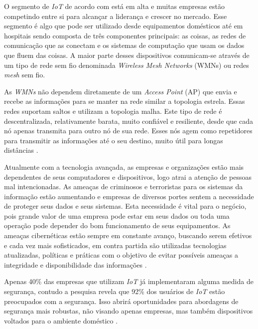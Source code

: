 \par O segmento de \emph{IoT} de acordo com  está em alta e muitas empresas estão competindo entre si para alcançar a liderança e crescer no mercado. Esse segmento é algo que pode ser utilizado desde equipamentos domésticos até em hospitais sendo composta de três componentes principais: as coisas, as redes de comunicação que as conectam e os sistemas de computação que usam os dados que fluem das coisas. A maior parte desses dispositivos comunicam-se através de um tipo de rede sem fio denominada \emph{Wireless Mesh Networks} (WMNs) ou redes \emph{mesh} sem fio.

\par As \emph{WMNs} não dependem diretamente de um \emph{Access Point} (AP) que envia e recebe as informa\c{c}\~oes para se manter na rede similar a topologia estrela. Essas redes suportam saltos e utilizam a topologia malha. Este tipo de rede é descentralizada, relativamente barata, muito confiável e resiliente, desde que cada n\'o apenas transmita para outro n\'o de sua rede. Esses n\'os agem como repetidores para transmitir as informações até o seu destino, muito útil para longas distâncias \cite{siddiqui2007}.

\par Atualmente com a tecnologia avançada, as empresas e organizações estão mais dependentes de seus computadores e dispositivos, logo atrai a aten\c{c}\~ao de pessoas mal intencionadas. As ameaças de criminosos e terroristas para os sistemas da informação estão aumentando e empresas de diversos portes sentem a necessidade de proteger seus dados e seus sistemas. Esta necessidade é vital para o negócio, pois grande valor de uma empresa pode estar em seus dados ou toda uma operação pode depender do bom funcionamento de seus equipamentos. As ameaças cibernéticas estão sempre em constante avanço, buscando serem efetivos e cada vez mais sofisticados, em contra partida s\~ao utilizadas tecnologias atualizadas, pol\'iticas e pr\'aticas com o objetivo de evitar possíveis ameaças a integridade e disponibilidade das informa\c{c}\~oes \cite{Malgeri2009a}.

\par Apenas 40\% das empresas que utilizam \emph{IoT} já implementaram alguma medida de segurança, contudo a pesquisa revela que 92\% dos usuários de \emph{IoT} estão preocupados com a segurança. Isso abrirá oportunidades para abordagens de segurança mais robustas, não visando apenas empresas, mas também dispositivos voltados para o ambiente doméstico \cite{KPMG2015a}.

